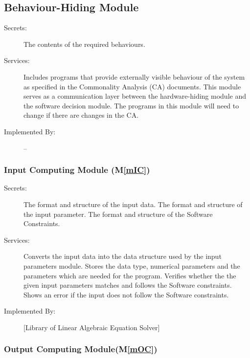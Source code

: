 \documentclass[12pt, titlepage]{article}
\newcommand{\mref}[1]{M\ref{#1}}
\begin{document}
\subsection{Behaviour-Hiding Module}

\begin{description}
\item[Secrets:]The contents of the required behaviours.
\item[Services:]Includes programs that provide externally visible behaviour of
  the system as specified in the Commonality Analysis (CA)
  documents. This module serves as a communication layer between the
  hardware-hiding module and the software decision module. The programs in this
  module will need to change if there are changes in the CA.
\item[Implemented By:] --
\end{description}

\subsubsection{Input Computing Module (\mref{mIC})}

\begin{description}
\item[Secrets:]The format and structure of the input data. The format and
  structure of the input parameter. The format and structure of the Software
  Constraints.
\item[Services:]Converts the input data into the data structure used by the
  input parameters module. 
  Stores the data type, numerical parameters and the parameters which are needed
  for the program. Verifies whether the the  given input
  parameters matches and follows the Software constraints. Shows an error if the
  input does not follow the Software constraints.
\item[Implemented By:] [Library of Linear Algebraic Equation Solver]
\end{description}


\subsubsection{Output Computing Module(\mref{mOC})}
\end{document}
